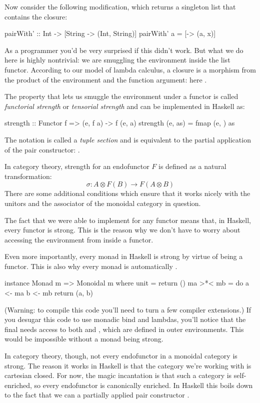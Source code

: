 \documentclass[DaoFP]{subfiles}
\begin{document}
Now consider the following modification, which returns a singleton list that contains the closure:
\begin{haskell}
pairWith' :: Int -> [String -> (Int, String)]
pairWith' a = [\x -> (a, x)]
\end{haskell}
As a programmer you'd be very surprised if this didn't work. But what we do here is highly nontrivial: we are smuggling the environment inside the list functor. According to our model of lambda calculus, a closure is a morphism from the product of the environment and the function argument: here . 

The property that lets us smuggle the environment under a functor is called \emph{functorial strength} or \emph{tensorial strength} and can be implemented in Haskell as:
\begin{haskell}
strength :: Functor f => (e, f a) -> f (e, a)
strength (e, as) = fmap (e, ) as
\end{haskell}
The notation  is called a \emph{tuple section} and is equivalent to the partial application of the pair constructor: .

In category theory, strength for an endofunctor $F$ is defined as a natural transformation:
\[ \sigma \colon A \otimes F(B) \to F (A \otimes B) \]
There are some additional conditions which ensure that it works nicely with the unitors and the associator of the monoidal category in question.

The fact that we were able to implement  for any functor means that, in Haskell, every functor is strong. This is the reason why we don't have to worry about accessing the environment from inside a functor. 

Even more importantly, every monad in Haskell is strong by virtue of being a functor. This is also why every monad is automatically . 
\begin{haskell}
instance Monad m => Monoidal m where
  unit = return ()
  ma >*< mb = do
    a <- ma
    b <- mb
    return (a, b)
\end{haskell}
(Warning: to compile this code you'll need to turn a few compiler extensions.) If you desugar this code to use monadic bind and lambdas, you'll notice that the final  needs access to both  and , which are defined in outer environments. This would be impossible without a monad being strong.

In category theory, though, not every endofunctor in a monoidal category is strong. The reason it works in Haskell is that the category we're working with is cartesian closed. For now, the magic incantation is that such a category is self-enriched, so every endofunctor is canonically enriched. In Haskell this boils down to the fact that we can  a partially applied pair constructor .
\end{document}
